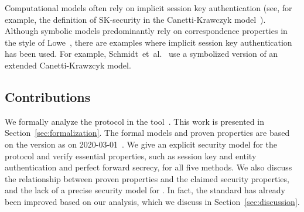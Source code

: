 \documentclass[runningheads, envcountsame, a4paper, draft, x11names]{llncs}
\begin{document}

Computational models often rely on implicit session key authentication
(see, for example, the definition of SK-security in the Canetti-Krawczyk
model~\cite{DBLP:conf/crypto/CanettiK02}).
%
Although symbolic models predominantly rely on correspondence properties
in the style of Lowe~\cite{DBLP:conf/csfw/Lowe97a}, there are examples where
implicit session key authentication has been used.
%
For example, Schmidt~et~al.~\cite{DBLP:conf/csfw/SchmidtMCB12} use a
symbolized version of an extended Canetti-Krawzcyk model.
%

\subsection{Contributions}
\label{sec:contributions}
We formally analyze the \mEdhoc{} protocol in the \mTamarin{}
tool~\cite{DBLP:conf/cav/MeierSCB13}.
%
This work is presented in Section~\ref{sec:formalization}.
%
The formal models and proven properties are based on the version as on
2020-03-01~\cite{selander-lake-edhoc-01}.
%
We give an explicit security model for the protocol and verify essential
properties, such as session key and entity authentication and perfect forward
secrecy, for all five methods.
%
%
We also discuss the relationship between proven properties and the claimed
security properties, and the lack of a precise security model for \mEdhoc{}.
%
In fact, the standard has already been improved based on our analysis,
which we discuss in Section~\ref{sec:discussion}.
%
\end{document}
